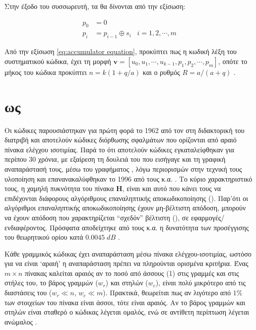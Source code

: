 Στην έξοδο του συσσωρευτή, τα  θα δίνονται από την εξίσωση:

\begin{equation}
\begin{aligned}
p_0 & = 0 \\ 
p_i & =p_{i-1}\oplus s_i\;\;\; i=1,2,\cdots,m
\end{aligned}
\label{eq:accumulator equation}
\end{equation}

Από την εξίσωση \ref{eq:accumulator equation}, προκύπτει πως η κωδική λέξη του συστηματικού  κώδικα, έχει τη μορφή $\mathbf{v}=[u_0, u_1,\cdots,u_{k-1},p_1,p_2,\cdots,p_m]$, οπότε το μήκος του κώδικα προκύπτει $n=k(1+q/a)$ και ο ρυθμός $R=a/(a+q)$ \cite{johnson2009iterative}.



\section{ ως }

Οι κώδικες  παρουσιάστηκαν για πρώτη φορά το 1962 από τον  στη διδακτορική του διατριβή \cite{gallager1962low} και αποτελούν κώδικες διόρθωσης σφαλμάτων που ορίζονται από αραιό πίνακα ελέγχου ισοτιμίας. Παρά το ότι αποτελούν  κώδικες εγκαταλείφθηκαν για περίπου 30 χρόνια, με εξαίρεση τη δουλειά του  \cite{tanner1981recursive} που εισήγαγε και τη γραφική αναπαράστασή τους, μέσω του γραφήματος , λόγω περιορισμών στην τεχνική τους υλοποίηση και επανανακαλύφθηκαν το 1996 από τους  κ.α. \cite{mackay1996near}. Tο κύριο χαρακτηριστικό τους, η χαμηλή πυκνότητα του πίνακα $\mathbf{H}$, είναι και αυτό που κάνει τους  να επιδέχονται διάφορους αλγόριθμους επαναληπτικής αποκωδικοποίησης (). Παρ’ότι οι αλγόριθμοι επαναληπτικής αποκωδικοποίησης έχουν μη-βέλτιστη απόδοση, μπορούν να έχουν απόδοση που χαρακτηρίζεται “σχεδόν” βέλτιστη (), σε εφαρμογές/ ενδιαφέροντος. Πρόσφατα αποδείχτηκε από τους  κ.α. η δυνατότητα των  προσέγγισης του θεωρητικού ορίου  κατά $0.0045\;dB$ \cite{chung2001design}.

Κάθε γραμμικός κώδικας έχει αναπαράσταση μέσω πίνακα ελέγχου-ισοτιμίας, ωστόσο για να είναι \enquote*{αραιή} η αναπαράσταση πρέπει να πληρούνται ορισμένα κριτήρια. Ένας $m\times n$ πίνακας καλείται αραιός αν το ποσό από άσσους (1) στις γραμμές και στις στήλες του, το βάρος γραμμών ($w_r$) και στηλών ($w_c$), είναι πολύ μικρότερο από τις διαστάσεις του ($w_r\ll n$, $w_c\ll m$). Πρακτικά, θεωρείται πως αν λιγότερο από $1\%$ των στοιχείων του πίνακα είναι άσσοι, τότε είναι αραιός. Αν το βάρος γραμμών και στηλών είναι σταθερό ο κώδικας  λέγεται ομαλός, ενώ σε αντίθετη περίπτωση λέγεται ανώμαλος \cite{ta2013tutorial}.

